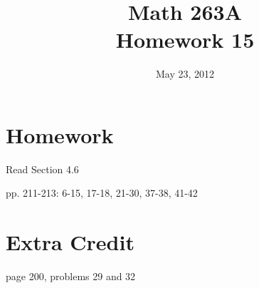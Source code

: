 \documentclass[fleqn]{exam}
\title{Math 263A \\ Homework 15}
\date{May 23, 2012}
\begin{document}
\maketitle

\section{Homework}

\begin{itemize*}
  \item Read Section 4.6
  \item pp. 211-213: 6-15, 17-18, 21-30, 37-38, 41-42
\end{itemize*}

\section{Extra Credit}
\begin{itemize*}
\item page 200, problems 29 and 32
\end{itemize*}
\end{document}
